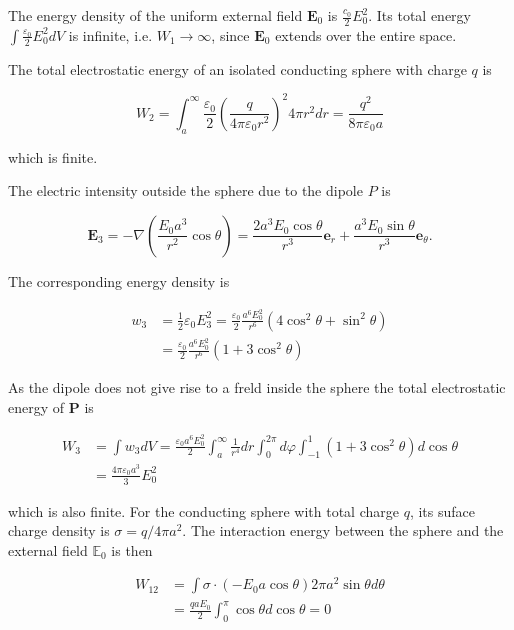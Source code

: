 \documentclass[10pt]{article}
\begin{document}
The energy density of the uniform external field $\mathbf{E}_{0}$ is $\frac{c_{0}}{2} E_{0}^{2}$. Its total energy $\int \frac{\varepsilon_{0}}{2} E_{0}^{2} d V$ is infinite, i.e. $W_{1} \rightarrow \infty$, since $\mathbf{E}_{0}$ extends over the entire space.

The total electrostatic energy of an isolated conducting sphere with charge $q$ is

$$
W_{2}=\int_{a}^{\infty} \frac{\varepsilon_{0}}{2}\left(\frac{q}{4 \pi \varepsilon_{0} r^{2}}\right)^{2} 4 \pi r^{2} d r=\frac{q^{2}}{8 \pi \varepsilon_{0} a}
$$

which is finite.

The electric intensity outside the sphere due to the dipole $P$ is

$$
\mathbf{E}_{3}=-\nabla\left(\frac{E_{0} a^{3}}{r^{2}} \cos \theta\right)=\frac{2 a^{3} E_{0} \cos \theta}{r^{3}} \mathbf{e}_{r}+\frac{a^{3} E_{0} \sin \theta}{r^{3}} \mathbf{e}_{\theta} .
$$

The corresponding energy density is

$$
\begin{aligned}
w_{3} &=\frac{1}{2} \varepsilon_{0} E_{3}^{2}=\frac{\varepsilon_{0}}{2} \frac{a^{6} E_{0}^{2}}{r^{6}}\left(4 \cos ^{2} \theta+\sin ^{2} \theta\right) \\
&=\frac{\varepsilon_{0}}{2} \frac{a^{6} E_{0}^{2}}{r^{6}}\left(1+3 \cos ^{2} \theta\right)
\end{aligned}
$$

As the dipole does not give rise to a freld inside the sphere the total electrostatic energy of $\mathbf{P}$ is

$$
\begin{aligned}
W_{3} &=\int w_{3} d V=\frac{\varepsilon_{0} a^{6} E_{0}^{2}}{2} \int_{a}^{\infty} \frac{1}{r^{4}} d r \int_{0}^{2 \pi} d \varphi \int_{-1}^{1}\left(1+3 \cos ^{2} \theta\right) d \cos \theta \\
&=\frac{4 \pi \varepsilon_{0} a^{3}}{3} E_{0}^{2}
\end{aligned}
$$

which is also finite. For the conducting sphere with total charge $q$, its suface charge density is $\sigma=q / 4 \pi a^{2}$. The interaction energy between the sphere and the external field $\mathbb{E}_{0}$ is then

$$
\begin{aligned}
W_{12} &=\int \sigma \cdot\left(-E_{0} a \cos \theta\right) 2 \pi a^{2} \sin \theta d \theta \\
&=\frac{q a E_{0}}{2} \int_{0}^{\pi} \cos \theta d \cos \theta=0
\end{aligned}
$$
\end{document}
